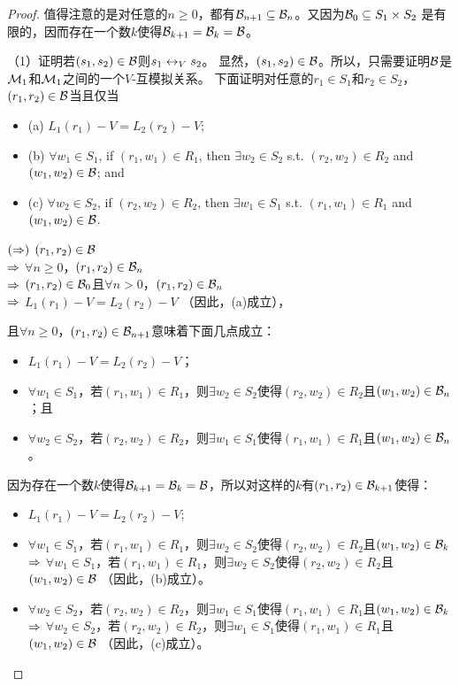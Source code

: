 \begin{proof}
	值得注意的是对任意的$n\geq 0$，都有${\cal B}_{n+1} \subseteq {\cal B}_n$。又因为${\cal B}_0\subseteq S_1 \times S_2$ 是有限的，因而存在一个数$k$使得${\cal B}_{k+1}={\cal B}_k = {\cal B}$。
	
	（1）证明若$(s_1, s_2)\in {\cal B}$则$s_1 \leftrightarrow_V s_2$。
	显然，$(s_1, s_2)\in {\cal B}$。所以，只需要证明${\cal B}$是${\cal M}_1$和${\cal M}_1$之间的一个$V$-互模拟关系。
	下面证明对任意的$r_1\in S_1$和$r_2\in S_2$，$(r_1,r_2) \in {\cal B}$当且仅当
	\begin{itemize}
		\item[](a) $L_1(r_1)-V = L_2(r_2)-V$;
		\item[](b) $\forall w_1\in S_1$, if $(r_1, w_1)\in R_1$, then $\exists w_2 \in S_2$ s.t. $(r_2,w_2) \in R_2$ and $(w_1, w_2) \in {\cal B}$; and 
		\item[](c) $\forall w_2\in S_2$, if $(r_2, w_2)\in R_2$, then $\exists w_1 \in S_1$ s.t. $(r_1,w_1) \in R_1$ and $(w_1, w_2)\in {\cal B} $.
	\end{itemize}

	$(\Rightarrow)$ $(r_1,r_2) \in {\cal B}$\\
	$\Rightarrow$ $\forall n\geq 0$，$(r_1,r_2)\in {\cal B}_n$\\
	$\Rightarrow$ $(r_1,r_2)\in {\cal B}_0$且$\forall n > 0$，$(r_1,r_2)\in {\cal B}_n$\\
	$\Rightarrow$ $L_1(r_1)-V = L_2(r_2)-V$ （因此，(a)成立），
	
	且$\forall n\geq 0$，$(r_1,r_2)\in {\cal B}_{n+1}$意味着下面几点成立：
	\begin{itemize}
		\item $L_1(r_1)-V = L_2(r_2)-V$；
		\item $\forall w_1 \in S_1$，若$(r_1, w_1)\in R_1$，则$\exists w_2 \in S_2$使得$(r_2,w_2) \in R_2$且$(w_1, w_2) \in {\cal B}_n$；且
		\item $\forall w_2\in S_2$，若$(r_2, w_2)\in R_2$，则$\exists w_1 \in S_1$使得$(r_1,w_1) \in R_1$且$(w_1, w_2)\in {\cal B}_n$。
	\end{itemize}
	
	因为存在一个数$k$使得${\cal B}_{k+1}={\cal B}_k = {\cal B}$，所以对这样的$k$有$(r_1,r_2)\in {\cal B}_{k+1}$使得：
	\begin{itemize}
		\item $L_1(r_1)-V = L_2(r_2)-V$;
		\item $\forall w_1 \in S_1$，若$(r_1, w_1)\in R_1$，则$\exists w_2 \in S_2$使得$(r_2,w_2) \in R_2$且$(w_1, w_2) \in {\cal B}_k$\\
		$\Rightarrow$ $\forall w_1 \in S_1$，若$(r_1, w_1)\in R_1$，则$\exists w_2 \in S_2$使得$(r_2,w_2) \in R_2$且$(w_1, w_2) \in {\cal B}$ （因此，(b)成立）。
		\item $\forall w_2\in S_2$，若$(r_2, w_2)\in R_2$，则$\exists w_1 \in S_1$使得$(r_1,w_1) \in R_1$且$(w_1, w_2)\in {\cal B}_k$\\
		$\Rightarrow$ $\forall w_2\in S_2$，若$(r_2, w_2)\in R_2$，则$\exists w_1 \in S_1$使得$(r_1,w_1) \in R_1$且$(w_1, w_2)\in {\cal B}$ （因此，(c)成立）。
	\end{itemize}
	

\end{proof}

